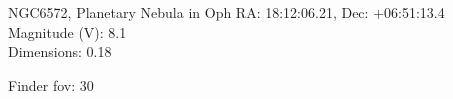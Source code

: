 \begin{block}{NGC6572, Planetary Nebula in Oph}
    RA: 18:12:06.21, Dec: +06:51:13.4 \\ 
    Magnitude (V): 8.1 \\ 
    Dimensions: 0.18 

    Finder fov: 30 
\end{block}